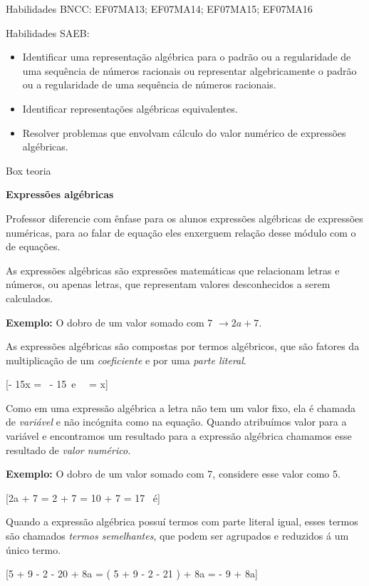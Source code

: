 Habilidades BNCC: EF07MA13; EF07MA14; EF07MA15; EF07MA16

Habilidades SAEB:

\begin{itemize}
\item
  Identificar uma representação algébrica para o padrão ou a
  regularidade de uma sequência de números racionais ou representar
  algebricamente o padrão ou a regularidade de uma sequência de números
  racionais.
\item
  Identificar representações algébricas equivalentes.
\item
  Resolver problemas que envolvam cálculo do valor numérico de
  expressões algébricas.
\end{itemize}

Box teoria

\textbf{{Expressões algébricas}}

Professor diferencie com ênfase para os alunos expressões algébricas de
expressões numéricas, para ao falar de equação eles enxerguem relação
desse módulo com o de equações.

As expressões algébricas são expressões matemáticas que relacionam
letras e números, ou apenas letras, que representam valores
desconhecidos a serem calculados.

\textbf{Exemplo:} O dobro de um valor somado com 7
\(\rightarrow 2a + 7\).

As expressões algébricas são compostas por termos algébricos, que são
fatores da multiplicação de um \emph{{coeficiente}} e por uma
\emph{{parte literal}}.

[- 15x \rightarrow {} = \  - 15\ e\ \  = x]

Como em uma expressão algébrica a letra não tem um valor fixo, ela é
chamada de \emph{{variável}} e não incógnita como na equação. Quando
atribuímos valor para a variável e encontramos um resultado para a
expressão algébrica chamamos esse resultado de \emph{{valor numérico.}}

\textbf{Exemplo:} O dobro de um valor somado com 7, considere esse valor
como 5.

[2a + 7 = 2  + 7 = 10 + 7 = 17 \leftarrow {}\ é]

Quando a expressão algébrica possuí termos com parte literal igual,
esses termos são chamados \emph{{termos semelhantes}}, que podem ser
agrupados e reduzidos á um único termo.

[5 + 9 - 2 - 20 + 8a = \left( 5 + 9 - 2 - 21 \right) + 8a = - 9 + 8a]

